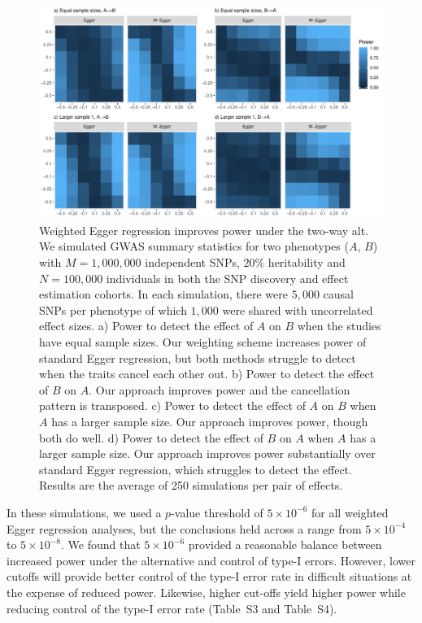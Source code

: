 \documentclass{article}
\begin{document}
\begin{figure}\label{figure2}
\includegraphics[width=\textwidth]{figures/figure2.pdf}
\caption{Weighted Egger regression improves power under the two-way alt.
 We simulated GWAS summary statistics for two phenotypes ($A$, $B$) with $M=1,000,000$
independent SNPs, $20\%$ heritability and $N = 100,000$ individuals in both
 the SNP discovery and effect estimation cohorts. In each simulation, there
 were $5,000$ causal SNPs per phenotype of which $1,000$ were shared with uncorrelated
 effect sizes. a) Power to detect the effect of $A$ on $B$ when the studies have equal
 sample sizes. Our weighting scheme increases power of standard Egger regression, but both
 methods struggle to detect when the traits cancel each other out. b) Power to detect the
 effect of $B$ on $A$. Our approach improves power and the cancellation pattern is transposed.
 c) Power to detect the effect of $A$ on $B$ when $A$ has a larger sample size. Our approach
 improves power, though both do well. d) Power to detect the effect of $B$ on $A$ when
  $A$ has a larger sample size. Our approach improves power substantially over standard
  Egger regression, which struggles to detect the effect. Results are the average of 250
  simulations per pair of effects.}
\end{figure}

In these simulations, we used a $p$-value threshold of $5\times 10^{-6}$
for all weighted Egger regression analyses, but the conclusions held across a range
from $5\times 10^{-4}$ to $5\times 10^{-8}$. We found that
$5\times 10^{-6}$ provided a reasonable balance between increased power under 
the alternative and control of type-I errors. However, lower
cutoffs will provide better control of the type-I error rate in difficult situations
at the expense of reduced power. Likewise, higher cut-offs yield higher power
while reducing control of the type-I error rate
(Table~S3 and Table~S4). 
\end{document}
